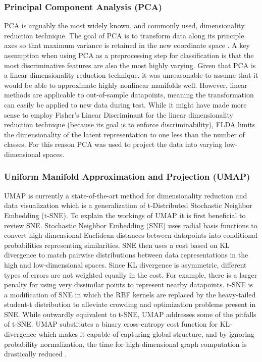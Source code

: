 \documentclass[conference]{IEEEtran}
\begin{document}
	\subsubsection*{Principal Component Analysis (PCA)}  PCA is arguably the most widely known, and commonly used, dimensionality reduction technique.  The goal of PCA is to transform data along its principle axes so that maximum variance is retained in the new coordinate space \cite{Tipping1999PPCA,Murphy2012Textbook}.  A key assumption when using PCA as a preprocessing step for classification is that the most discriminative features are also the most highly varying. Given that PCA is a linear dimensionality reduction technique, it was unreasonable to assume that it would be able to approximate highly nonlinear manifolds well.   However, linear methods are applicable to out-of-sample datapoints, meaning the transformation can easily be applied to new data during test. While it might have made more sense to employ Fisher's Linear Discriminant for the linear dimensionality reduction technique (because its goal is to enforce discriminability), FLDA limits the dimensionality of the latent representation to one less than the number of classes.  For this reason PCA was used to project the data into varying low-dimensional spaces.
	
	\subsubsection*{Uniform Manifold Approximation and Projection (UMAP)} UMAP is currently a state-of-the-art method for dimensionality reduction and data visualization which is a generalization of t-Distributed Stochastic Neighbor Embedding (t-SNE).  To explain the workings of UMAP it is first beneficial to review SNE. Stochastic Neighbor Embedding (SNE) uses radial basis functions  to convert high-dimensional Euclidean distances between datapoints into conditional probabilities representing similarities.  SNE then uses a cost based on KL divergence to match pairwise distributions between data representations in the high and low-dimensional spaces.  Since KL divergence is asymmetric, different types of errors are not weighted equally in the cost.  For example, there is a larger penalty for using very dissimilar points to represent nearby datapoints.  t-SNE is a modification of SNE in which the RBF kernels are replaced by the heavy-tailed student-t distribution \cite{vanDerMaaten2008tSNE} to alleviate crowding and optimization problems present in SNE.   While outwardly equivalent to t-SNE, UMAP addresses some of the pitfalls of t-SNE.  UMAP substitutes a binary cross-entropy cost function for KL-divergence which makes it capable of capturing global structure, and by ignoring probability normalization, the time for high-dimensional graph computation is drastically reduced \cite{McInnes2018UMAP}.
\end{document}
